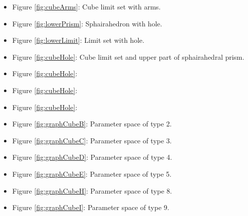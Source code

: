\documentclass[suppldata, dvipdfmx]{interact}
\theoremstyle{plain}%
\theoremstyle{definition}
\theoremstyle{remark}
\theoremstyle{problemstyle}
\begin{document}
\begin{itemize}
\item Figure \ref{fig:cubeArms}: Cube limit set with arms.
\item Figure \ref{fig:lowerPrism}: Sphairahedron with hole.
\item Figure \ref{fig:lowerLimit}: Limit set with hole.

\item Figure \ref{fig:cubeHole}: Cube limit set and upper part of
      sphairahedral prism.
\item Figure \ref{fig:cubeHole}:
\item Figure \ref{fig:cubeHole}:
\item Figure \ref{fig:cubeHole}:

\item Figure \ref{fig:graphCubeB}: Parameter space of type 2. 
\item Figure \ref{fig:graphCubeC}: Parameter space of type 3.
\item Figure \ref{fig:graphCubeD}: Parameter space of type 4.
\item Figure \ref{fig:graphCubeE}: Parameter space of type 5.
\item Figure \ref{fig:graphCubeH}: Parameter space of type 8.
\item Figure \ref{fig:graphCubeI}: Parameter space of type 9.

\end{itemize}
\end{document}
